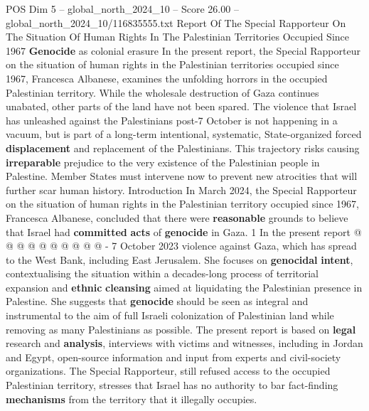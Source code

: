 \begin{textsample}{POS Dim 5 – global\_north\_2024\_10 – Score 26.00 – global\_north\_2024\_10/116835555.txt}  \label{ex:f5_pos_401}
Report Of The Special Rapporteur On The Situation Of Human Rights In The Palestinian Territories Occupied Since 1967 \textbf{Genocide} as colonial erasure In the present report, the Special Rapporteur on the situation of human rights in the Palestinian territories occupied since 1967, Francesca Albanese, examines the unfolding horrors in the occupied Palestinian territory.
While the wholesale destruction of Gaza continues unabated, other parts of the land have not been spared.
The violence that Israel has unleashed against the Palestinians post-7 October is not happening in a vacuum, but is part of a long-term intentional, systematic, State-organized forced \textbf{displacement} and replacement of the Palestinians.
This trajectory risks causing \textbf{irreparable} prejudice to the very existence of the Palestinian people in Palestine.
Member States must intervene now to prevent new atrocities that will further scar human history.
Introduction In March 2024, the Special Rapporteur on the situation of human rights in the Palestinian territory occupied since 1967, Francesca Albanese, concluded that there were \textbf{reasonable} grounds to believe that Israel had \textbf{committed} \textbf{acts} of \textbf{genocide} in Gaza. 1 In the present report @ @ @ @ @ @ @ @ @ @ - 7 October 2023 violence against Gaza, which has spread to the West Bank, including East Jerusalem.
She focuses on \textbf{genocidal} \textbf{intent}, contextualising the situation within a decades-long process of territorial expansion and \textbf{ethnic} \textbf{cleansing} aimed at liquidating the Palestinian presence in Palestine.
She suggests that \textbf{genocide} should be seen as integral and instrumental to the aim of full Israeli colonization of Palestinian land while removing as many Palestinians as possible.
The present report is based on \textbf{legal} research and \textbf{analysis}, interviews with victims and witnesses, including in Jordan and Egypt, open-source information and input from experts and civil-society organizations.
The Special Rapporteur, still refused access to the occupied Palestinian territory, stresses that Israel has no authority to bar fact-finding \textbf{mechanisms} from the territory that it illegally occupies.

\end{textsample}
